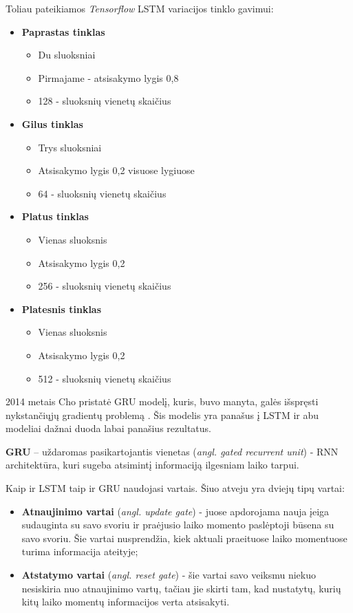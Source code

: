 \documentclass{VUMIFPSbakalaurinis}
\begin{document}
Toliau pateikiamos \textit{Tensorflow} LSTM variacijos tinklo gavimui:
\begin{itemize}
	\item \textbf{Paprastas tinklas}
        \begin{itemize}
        		\item Du sluoksniai
	        	\item Pirmajame - atsisakymo lygis 0,8
        		\item 128 - sluoksnių vienetų skaičius
        \end{itemize}

	\item \textbf{Gilus tinklas}
	\begin{itemize}
		\item Trys sluoksniai
		\item Atsisakymo lygis 0,2 visuose lygiuose
		\item 64 - sluoksnių vienetų skaičius
	\end{itemize}

	\item \textbf{Platus tinklas}
	\begin{itemize}
		\item Vienas sluoksnis
		\item Atsisakymo lygis 0,2
		\item 256 - sluoksnių vienetų skaičius	
	\end{itemize}

	\item \textbf{Platesnis tinklas}
	\begin{itemize}
		\item Vienas sluoksnis
		\item Atsisakymo lygis 0,2
		\item 512 - sluoksnių vienetų skaičius
	\end{itemize}
\end{itemize}


2014 metais Cho pristatė GRU modelį, kuris, buvo manyta, galės išspręsti nykstančiųjų gradientų problemą \cite{DBLP:journals/corr/ChoMGBSB14}. Šis modelis yra panašus į LSTM ir abu modeliai dažnai duoda labai panašius rezultatus.

\textbf{GRU} – uždaromas pasikartojantis vienetas (\textit{angl. gated recurrent unit}) - RNN architektūra, kuri sugeba atsimintį informaciją ilgesniam laiko tarpui. 

Kaip ir LSTM taip ir GRU naudojasi vartais. Šiuo atveju yra dviejų tipų vartai:
\begin{itemize}
	\item \textbf{Atnaujinimo vartai} (\textit{angl. update gate}) - juose apdorojama nauja įeiga sudauginta su savo svoriu ir praėjusio laiko momento paslėptoji būsena su savo svoriu. Šie vartai nusprendžia, kiek aktuali praeituose laiko momentuose turima informacija ateityje;
	\item \textbf{Atstatymo vartai} (\textit{angl. reset gate}) - šie vartai savo veiksmu niekuo nesiskiria nuo atnaujinimo vartų, tačiau jie skirti tam, kad nustatytų, kurių kitų laiko momentų informacijos verta atsisakyti.
\end{itemize}
\end{document}
